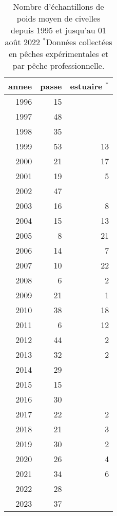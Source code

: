 \begin{table}[ht]
\centering
\begin{tabular}{rrr}
  \hline
annee & passe & estuaire $^*$ \\ 
  \hline
1996 & 15 &  \\ 
  1997 & 48 &  \\ 
  1998 & 35 &  \\ 
  1999 & 53 & 13 \\ 
  2000 & 21 & 17 \\ 
  2001 & 19 & 5 \\ 
  2002 & 47 &  \\ 
  2003 & 16 & 8 \\ 
  2004 & 15 & 13 \\ 
  2005 & 8 & 21 \\ 
  2006 & 14 & 7 \\ 
  2007 & 10 & 22 \\ 
  2008 & 6 & 2 \\ 
  2009 & 21 & 1 \\ 
  2010 & 38 & 18 \\ 
  2011 & 6 & 12 \\ 
  2012 & 44 & 2 \\ 
  2013 & 32 & 2 \\ 
  2014 & 29 &  \\ 
  2015 & 15 &  \\ 
  2016 & 30 &  \\ 
  2017 & 22 & 2 \\ 
  2018 & 21 & 3 \\ 
  2019 & 30 & 2 \\ 
  2020 & 26 & 4 \\ 
  2021 & 34 & 6 \\ 
  2022 & 28 &  \\ 
  2023 & 37 &  \\ 
   \hline
\end{tabular}
\caption{Nombre d'échantillons de poids moyen de civelles depuis 1995 et jusqu'au 01 août 2022 $^*$Données collectées en pêches expérimentales et par pêche professionnelle.} 
\label{tnpm}
\end{table}

